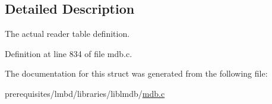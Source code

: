 \subsection{Detailed Description}
The actual reader table definition. 

Definition at line 834 of file mdb.\+c.



The documentation for this struct was generated from the following file\+:\begin{DoxyCompactItemize}
\item 
prerequisites/lmbd/libraries/liblmdb/\mbox{\hyperlink{mdb_8c}{mdb.\+c}}\end{DoxyCompactItemize}
